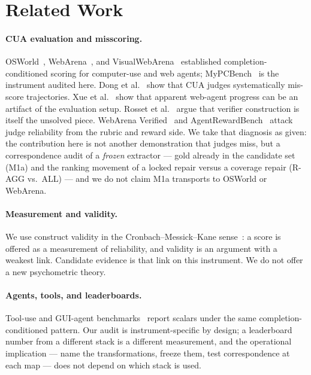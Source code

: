 \documentclass[sigconf,anonymous]{aamas}
\begin{document}
\section{Related Work}
\label{sec:related}

\paragraph{CUA evaluation and misscoring.}
OSWorld~\citep{xie2024osworld}, WebArena~\citep{zhou2024webarena}, and VisualWebArena~\citep{koh2024visualwebarena} established completion-conditioned scoring for computer-use and web agents; MyPCBench~\citep{jang2026mypcbench} is the instrument audited here.
Dong et al.~\citep{dong2026misscore} show that CUA judges systematically mis-score trajectories.
Xue et al.~\citep{xue2025illusion} show that apparent web-agent progress can be an artifact of the evaluation setup.
Rosset et al.~\citep{rosset2026verifiers} argue that verifier construction is itself the unsolved piece.
WebArena Verified~\citep{hattami2025webarena} and AgentRewardBench~\citep{lu2025agentrewardbench} attack judge reliability from the rubric and reward side.
We take that diagnosis as given: the contribution here is not another demonstration that judges miss, but a correspondence audit of a \emph{frozen} extractor --- gold already in the candidate set (M1a) and the ranking movement of a locked repair versus a coverage repair (R-AGG vs.\ ALL) --- and we do not claim M1a transports to OSWorld or WebArena.

\paragraph{Measurement and validity.}
We use construct validity in the Cronbach--Messick--Kane sense~\citep{cronbach1955construct,messick1995validity,kane2013validating}: a score is offered as a measurement of reliability, and validity is an argument with a weakest link.
Candidate evidence is that link on this instrument.
We do not offer a new psychometric theory.

\paragraph{Agents, tools, and leaderboards.}
Tool-use and GUI-agent benchmarks~\citep{yao2022webshop,deng2023mind2web,cheng2024seeclick} report scalars under the same completion-conditioned pattern.
Our audit is instrument-specific by design; a leaderboard number from a different stack is a different measurement, and the operational implication --- name the transformations, freeze them, test correspondence at each map --- does not depend on which stack is used.
\end{document}
